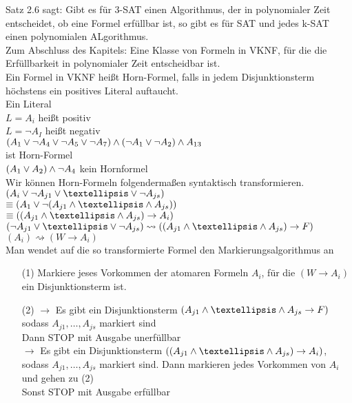 Satz 2.6 sagt: Gibt es für 3-SAT einen Algorithmus, der in polynomialer Zeit entscheidet, ob eine Formel erfüllbar ist, so gibt es für SAT und jedes k-SAT einen polynomialen ALgorithmus.\\

Zum Abschluss des Kapitels: Eine Klasse von Formeln in VKNF, für die die Erfüllbarkeit in polynomialer Zeit entscheidbar ist.\\

Ein Formel in VKNF heißt Horn-Formel, falls in jedem Disjunktionsterm höchstens ein positives Literal auftaucht.\\

Ein Literal\\
$L = A_i$ heißt positiv\\
$L = \neg A_I$ heißt negativ\\

\beispiel{}
$(A_1 \vee \neg A_4 \vee \neg A_5 \vee \neg A_7) \wedge (\neg A_1 \vee \neg A_2) \wedge A_{13}$\\
ist Horn-Formel\\

$(A_1 \vee A_2) \wedge \neg A_4$ kein Hornformel\\

Wir können Horn-Formeln folgendermaßen syntaktisch transformieren.\\

$(A_i \OR \neg A_{j1} \OR … \OR \neg A_{js})$\\
$\equiv (A_1 \OR \neg (A_{j1} \AND … \AND A_{js} ))$\\
$\equiv ((A_{j1} \AND … \AND A_{js} ) \rightarrow A_i )$\\

$(\neg A_{j1} \OR … \OR \neg A_{js} ) \rightsquigarrow ((A_{j1} \AND … \AND A_{js}) \rightarrow F)$\\
$(A_i) \rightsquigarrow (W \rightarrow A_i)$\\

Man wendet auf die so transformierte Formel den Markierungsalgorithmus an
\begin{enumerate}
\item[(1)] Markiere jeses Vorkommen der atomaren Formeln $A_i$, für die $(W \rightarrow A_i)$ ein Disjunktionsterm ist.

\item[(2)] $\rightarrow$ Es gibt ein Disjunktionsterm $(A_{j1} \AND … \AND A_{js} \rightarrow F)$\\
sodass $A_{j1}, …, A_{js}$ markiert sind\\
Dann STOP mit Ausgabe unerfüllbar\\
$\rightarrow$ Es gibt ein Disjunktionsterm $((A_{j1} \AND … \AND A_{js}) \rightarrow A_i)$, sodass $A_{j1}, …, A_{js}$ markiert sind. Dann markieren jedes Vorkommen von $A_i$ und gehen zu (2)\\
Sonst STOP mit Ausgabe erfüllbar
\end{enumerate}

